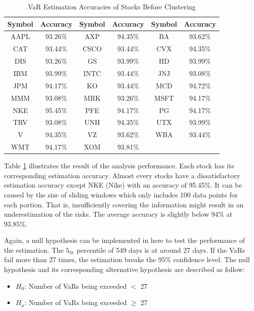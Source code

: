 \documentclass[11pt]{article} %
\theoremstyle{plain}
\theoremstyle{definition}
\begin{document}
{
  \begin{table}[ht]
    \centering
    \small
    \begin{tabular}{|c|c|c|c|c|c|}
        \hline
        Symbol & Accuracy & Symbol & Accuracy & Symbol & Accuracy \\
        \hline
        AAPL & 93.26\% & AXP & 94.35\% & BA & 93.62\% \\
        CAT & 93.44\% & CSCO & 93.44\% & CVX & 94.35\% \\
        DIS & 93.26\% & GS & 93.99\% & HD & 93.99\% \\
        IBM & 93.99\% & INTC & 93.44\% & JNJ & 93.08\% \\
        JPM & 94.17\% & KO & 93.44\% & MCD & 94.72\% \\
        MMM & 93.08\% & MRK & 93.26\% & MSFT & 94.17\% \\
        NKE & 95.45\% & PFE & 94.17\% & PG & 94.17\% \\
        TRV & 93.08\% & UNH & 94.35\% & UTX & 93.99\% \\
        V & 94.35\% & VZ & 93.62\% & WBA & 93.44\% \\
        WMT & 94.17\% & XOM & 93.81\% & & \\
        \hline
    \end{tabular}
    \caption{VaR Estimation Accuracies of Stocks Before Clustering}
    \label{table:accstockbefore}
  \end{table}
}

Table \ref{table:accstockbefore} illustrates the result of the analysis performance. Each stock has its corresponding estimation accuracy. Almost every stocks have a dissatisfactory estimation accuracy except NKE (Nike) with an accuracy of 95.45\%. It can be caused by the size of sliding windows which only includes 100 data points for each portion. That is, insufficiently covering the information might result in an underestimation of the risks. The average accuracy is slightly below 94\% at 93.85\%.

Again, a null hypothesis can be implemented in here to test the performance of the estimation. The $5_{th}$ percentile of 549 days is at around 27 days. If the VaRs fail more than 27 times, the estimation breaks the 95\% confidence level. The null hypothesis and its corresponding alternative hypothesis are described as follow:

\begin{itemize}
    \item \textsl{$H_0$}: Number of VaRs being exceeded $<$ 27
    \item \textsl{$H_a$}: Number of VaRs being exceeded $\geq$ 27
\end{itemize}
\end{document}
